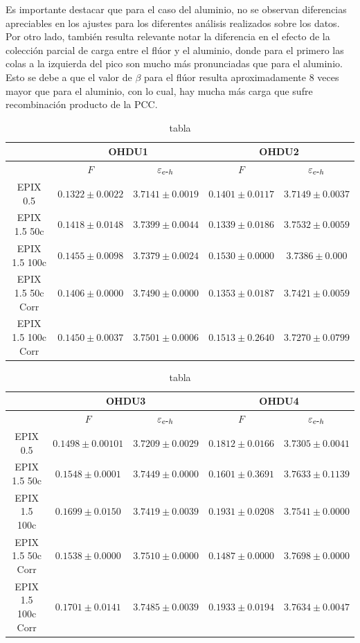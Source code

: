 Es importante destacar que para el caso del aluminio, no se observan diferencias apreciables en los ajustes para los diferentes análisis realizados sobre los datos. Por otro lado, también resulta relevante notar la diferencia en el efecto de la colección parcial de carga entre el flúor y el aluminio, donde para el primero las colas a la izquierda del pico son mucho más pronunciadas que para el aluminio. Esto se debe a que el valor de $\beta$ para el flúor resulta aproximadamente $8$ veces mayor que para el aluminio, con lo cual, hay mucha más carga que sufre recombinación producto de la PCC.
\begin{table}[H]
\centering
\begin{tabular}{@{}ccccc@{}}
\toprule
                & \multicolumn{2}{c}{OHDU1}                 & \multicolumn{2}{c}{OHDU2}                 \\ \hline\hline
                & $F$                 & $\varepsilon_{e\mbox{-}h}$ & $F$                 & $\varepsilon_{e\mbox{-}h}$ \\
EPIX 0.5 & $0.1322 \pm 0.0022$ & $3.7141 \pm 0.0019$ & $0.1401 \pm 0.0117$ & $3.7149 \pm 0.0037$ \\ \hline
EPIX 1.5 50c & $0.1418 \pm 0.0148$ & $3.7399 \pm 0.0044$ & $0.1339 \pm 0.0186$ & $3.7532 \pm 0.0059$ \\
EPIX 1.5 100c & $0.1455 \pm 0.0098$ & $3.7379 \pm 0.0024$ & $0.1530 \pm 0.0000$ & $3.7386 \pm 0.000$ \\ \hline
EPIX 1.5 50c Corr & $0.1406 \pm 0.0000$ & $3.7490 \pm 0.0000$ & $0.1353 \pm 0.0187$ & $3.7421 \pm 0.0059$ \\
EPIX 1.5 100c Corr & $0.1450 \pm 0.0037$ & $3.7501 \pm 0.0006$ & $0.1513 \pm 0.2640$ & $3.7270 \pm 0.0799$ \\ \bottomrule \hline
\end{tabular}
\caption{tabla}
\label{tab:FanoEehOHDU1y2}
\end{table}
\begin{table}[H]
\centering
\begin{tabular}{@{}ccccc@{}}
\toprule
                & \multicolumn{2}{c}{OHDU3}                 & \multicolumn{2}{c}{OHDU4}                 \\ \hline\hline
                & $F$                 & $\varepsilon_{e\mbox{-}h}$ & $F$                 & $\varepsilon_{e\mbox{-}h}$ \\
EPIX 0.5 & $0.1498 \pm 0.00101$ & $3.7209 \pm 0.0029$ & $0.1812 \pm 0.0166$ & $3.7305 \pm 0.0041$ \\ \hline
EPIX 1.5 50c & $0.1548 \pm 0.0001$ & $3.7449 \pm 0.0000$ & $0.1601 \pm 0.3691$ & $3.7633 \pm 0.1139$ \\
EPIX 1.5 100c & $0.1699 \pm 0.0150$ & $3.7419 \pm 0.0039$ & $0.1931 \pm 0.0208$ & $3.7541 \pm 0.0000$ \\ \hline
EPIX 1.5 50c  Corr& $0.1538 \pm 0.0000$ & $3.7510 \pm 0.0000$ & $0.1487 \pm 0.0000$ & $3.7698 \pm 0.0000$ \\
EPIX 1.5 100c Corr& $0.1701 \pm 0.0141$ & $3.7485 \pm 0.0039$ & $0.1933 \pm 0.0194$ & $3.7634 \pm 0.0047$ \\ \bottomrule \hline
\end{tabular}
\caption{tabla}
\label{tab:FanoEehOHDU3y4}
\end{table}

